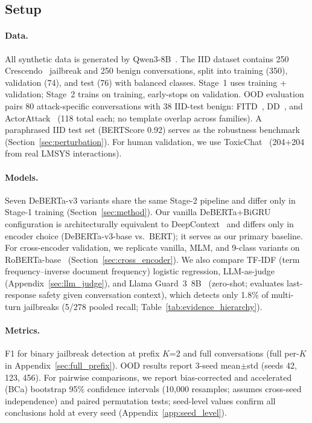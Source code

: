 \subsection{Setup}

\paragraph{Data.}
All synthetic data is generated by Qwen3-8B~\citep{qwen3_2025}.
The IID dataset contains 250 Crescendo~\citep{russinovich2024crescendo} jailbreak and 250 benign conversations, split into training (350), validation (74), and test (76) with balanced classes.
Stage~1 uses training + validation; Stage~2 trains on training, early-stops on validation.
OOD evaluation pairs 80 attack-specific conversations with 38 IID-test benign: FITD~\citep{fitd2024}, DD~\citep{deceptivedelight2024}, and ActorAttack~\citep{ren2024actorattack} (118 total each; no template overlap across families).
A paraphrased IID test set (BERTScore 0.92) serves as the robustness benchmark (Section~\ref{sec:perturbation}).
For human validation, we use ToxicChat~\citep{lin2023toxicchat} (204+204 from real LMSYS interactions).

\paragraph{Models.}
Seven DeBERTa-v3 variants share the same Stage-2 pipeline and differ only in Stage-1 training (Section~\ref{sec:method}).
Our vanilla DeBERTa+BiGRU configuration is architecturally equivalent to DeepContext~\citep{deepcontext2026} and differs only in encoder choice (DeBERTa-v3-base vs.\ BERT); it serves as our primary baseline.
For cross-encoder validation, we replicate vanilla, MLM, and 9-class variants on RoBERTa-base~\citep{liu2019roberta} (Section~\ref{sec:cross_encoder}).
We also compare TF-IDF (term frequency--inverse document frequency) logistic regression, LLM-as-judge (Appendix~\ref{sec:llm_judge}), and Llama Guard~3~8B~\citep{metallamaguard3_2024} (zero-shot; evaluates last-response safety given conversation context), which detects only 1.8\% of multi-turn jailbreaks (5/278 pooled recall; Table~\ref{tab:evidence_hierarchy}).

\paragraph{Metrics.}
F1 for binary jailbreak detection at prefix $K$=2 and full conversations (full per-$K$ in Appendix~\ref{sec:full_prefix}).
OOD results report 3-seed mean$\pm$std (seeds 42, 123, 456).
For pairwise comparisons, we report bias-corrected and accelerated (BCa) bootstrap 95\% confidence intervals (10,000 resamples; assumes cross-seed independence) and paired permutation tests; seed-level values confirm all conclusions hold at every seed (Appendix~\ref{app:seed_level}).

